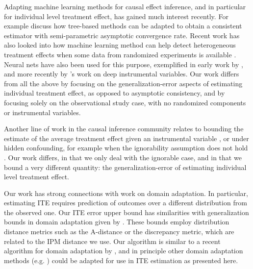 Adapting machine learning methods for causal effect inference, and in particular for individual level treatment effect, has gained much interest recently. For example \citet{wager2015estimation,athey2016recursive} discuss how tree-based methods can be adapted to obtain a consistent estimator with semi-parametric asymptotic convergence rate. %
Recent work has also looked into how machine learning method can help detect heterogeneous treatment effects when some data from randomized experiments is available \citep{taddy2016nonparametric,peysakhovich2016combining}.
Neural nets have also been used for this purpose, exemplified in early work by \citet{beck2000improving}, and more recently by \citet{hartford2016counterfactual}'s work on deep instrumental variables.
Our work differs from all the above by focusing on the generalization-error aspects of estimating individual treatment effect, as opposed to asymptotic consistency, and by focusing solely on the observational study case, with no randomized components or instrumental variables.

Another line of work in the causal inference community relates to bounding the estimate of the average treatment effect given an instrumental variable \citep{balke1997bounds,bareinboim2012controlling}, or under hidden confounding, for example when the ignorability assumption does not hold \citep{pearl2009causality,cai2008bounds}. Our work differs, in that we only deal with the ignorable case, and in that we bound a very different quantity: the generalization-error of estimating individual level treatment effect.

Our work has strong connections with work on domain adaptation. In particular, estimating ITE requires prediction of outcomes over a different distribution from the observed one. Our ITE error upper bound has similarities with generalization bounds in domain adaptation given by \citet{ben2007analysis,mansour2009bdomain,bendavid2010theory,cortes2014domain}.
These bounds employ distribution distance metrics such as the A-distance or the discrepancy metric, which are related to the IPM distance we use. Our algorithm is similar to a recent algorithm for domain adaptation by \citet{JMLR:v17:15-239}, and in principle other domain adaptation methods (e.g. \citet{daume2009frustratingly,pan2011domain,sun2016return}) could be adapted for use in ITE estimation as presented here.

